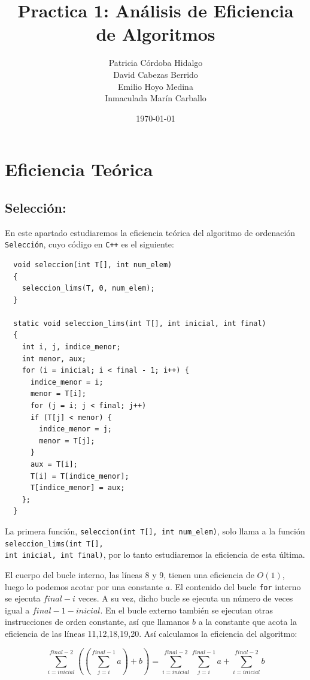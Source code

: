 \documentclass{article}
\title{\huge Practica 1: Análisis de Eficiencia de
  Algoritmos\vspace{20mm}}
\author{Patricia Córdoba Hidalgo \\ David
  Cabezas Berrido \\ Emilio Hoyo Medina \\ Inmaculada Marín Carballo}
\date{\vspace{10mm}\today}
\begin{document}
\maketitle

\newpage
\tableofcontents
\newpage

\section{Eficiencia Teórica}

\subsection{Selección:}

En este apartado estudiaremos la eficiencia teórica del algoritmo de ordenación \verb-Selección-, cuyo código en \verb-C++- es el siguiente: 

\begin{lstlisting}
  void seleccion(int T[], int num_elem)
  {
    seleccion_lims(T, 0, num_elem);
  }
  
  static void seleccion_lims(int T[], int inicial, int final)
  {
    int i, j, indice_menor;
    int menor, aux;
    for (i = inicial; i < final - 1; i++) {
      indice_menor = i;
      menor = T[i];
      for (j = i; j < final; j++)
      if (T[j] < menor) {
        indice_menor = j;
        menor = T[j];
      }
      aux = T[i];
      T[i] = T[indice_menor];
      T[indice_menor] = aux;
    };
  }

\end{lstlisting}
La primera función, \verb-seleccion(int T[], int num_elem)-, solo llama a la función \verb-seleccion_lims(int T[],- \\ \verb-int inicial, int final)-, por lo tanto estudiaremos la eficiencia de esta última.

El cuerpo del bucle interno, las líneas 8 y 9, tienen una eficiencia de $O(1)$, luego lo podemos acotar por una constante $a$.
El contenido del bucle \verb-for- interno se ejecuta $final-i$ veces. A su vez, dicho bucle se ejecuta un número de veces igual a $final-1-inicial$. En el bucle externo también se ejecutan otras instrucciones de orden constante, así que llamanos $b$ a la constante que acota la eficiencia de las líneas 11,12,18,19,20.
Así calculamos la eficiencia del algoritmo:

\begin{equation*}
  \sum\limits_{i=inicial}^{final-2}\left(\left(\sum\limits_{j=i}^{final-1}a\right)+b\right) = \sum\limits_{i=inicial}^{final-2}\sum\limits_{j=i}^{final-1}a + \sum\limits_{i=inicial}^{final-2}b
\end{equation*}
\end{document}
